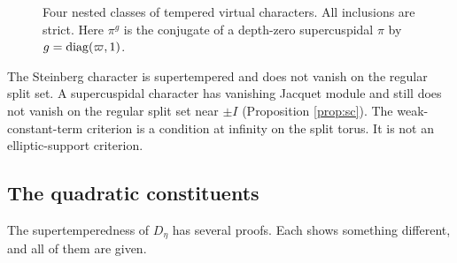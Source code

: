 \begin{figure}[htbp]\centering
{}
\caption{Four nested classes of tempered virtual characters. All inclusions are strict. Here $\pi^g$ is the conjugate of a depth-zero supercuspidal $\pi$ by $g=\operatorname{diag}(\varpi,1)$.}\label{fig:nested}
\end{figure}

\begin{remark}\label{rem:support}
The Steinberg character is supertempered and does not vanish on the regular split set. A supercuspidal character has vanishing Jacquet module and still does not vanish on the regular split set near $\pm I$ (Proposition \ref{prop:sc}). The weak-constant-term criterion is a condition at infinity on the split torus. It is not an elliptic-support criterion.
\end{remark}

\subsection{The quadratic constituents}\label{sub:quad}
The supertemperedness of $D_\eta$ has several proofs. Each shows something different, and all of them are given.

